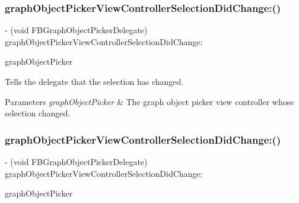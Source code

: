 \subsubsection{\texorpdfstring{graph\+Object\+Picker\+View\+Controller\+Selection\+Did\+Change\+:()}{graphObjectPickerViewControllerSelectionDidChange:()}\hspace{0.1cm}{\footnotesize\ttfamily [1/5]}}
{\footnotesize\ttfamily -\/ (void F\+B\+Graph\+Object\+Picker\+Delegate) graph\+Object\+Picker\+View\+Controller\+Selection\+Did\+Change\+: \begin{DoxyParamCaption}\item[{(\hyperlink{interfaceFBGraphObjectPickerViewController}{F\+B\+Graph\+Object\+Picker\+View\+Controller} $\ast$)}]{graph\+Object\+Picker }\end{DoxyParamCaption}\hspace{0.3cm}{\ttfamily [optional]}}

Tells the delegate that the selection has changed.


\begin{DoxyParams}{Parameters}
{\em graph\+Object\+Picker} & The graph object picker view controller whose selection changed. \\
\hline
\end{DoxyParams}
\mbox{\label{protocolFBGraphObjectPickerDelegate_01-p_a7c9da228bb329ef648df31794c7c7113}} 
\subsubsection{\texorpdfstring{graph\+Object\+Picker\+View\+Controller\+Selection\+Did\+Change\+:()}{graphObjectPickerViewControllerSelectionDidChange:()}\hspace{0.1cm}{\footnotesize\ttfamily [2/5]}}
{\footnotesize\ttfamily -\/ (void F\+B\+Graph\+Object\+Picker\+Delegate) graph\+Object\+Picker\+View\+Controller\+Selection\+Did\+Change\+: \begin{DoxyParamCaption}\item[{(\hyperlink{interfaceFBGraphObjectPickerViewController}{F\+B\+Graph\+Object\+Picker\+View\+Controller} $\ast$)}]{graph\+Object\+Picker }\end{DoxyParamCaption}\hspace{0.3cm}{\ttfamily [optional]}}

